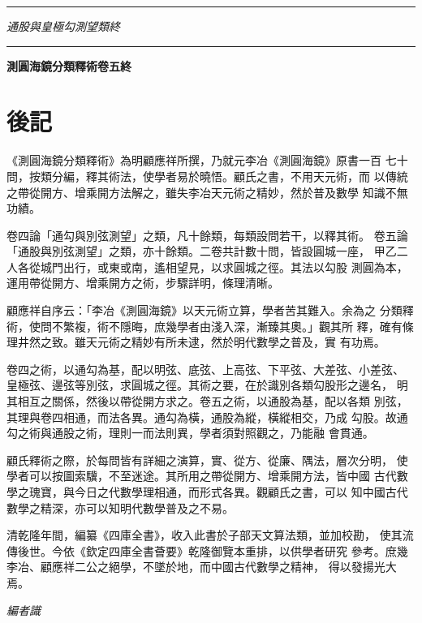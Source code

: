 \documentclass[11pt,a4paper]{article}
\newcommand{\longline}{\noindent\rule{\textwidth}{0.4pt}}
\begin{document}
\vspace{0.5cm}
\longline
\begin{center}
\textit{通股與皇極勾測望類終}
\end{center}

\vspace{0.5cm}
\longline
\begin{center}
{\Large\bfseries\color{volcolor} 測圓海鏡分類釋術卷五終}
\end{center}

\newpage

\section*{後記}

《測圓海鏡分類釋術》為明顧應祥所撰，乃就元李冶《測圓海鏡》原書一百
七十問，按類分編，釋其術法，使學者易於曉悟。顧氏之書，不用天元術，而
以傳統之帶從開方、增乘開方法解之，雖失李冶天元術之精妙，然於普及數學
知識不無功績。

卷四論「通勾與別弦測望」之類，凡十餘類，每類設問若干，以釋其術。
卷五論「通股與別弦測望」之類，亦十餘類。二卷共計數十問，皆設圓城一座，
甲乙二人各從城門出行，或東或南，遙相望見，以求圓城之徑。其法以勾股
測圓為本，運用帶從開方、增乘開方之術，步驟詳明，條理清晰。

顧應祥自序云：「李冶《測圓海鏡》以天元術立算，學者苦其難入。余為之
分類釋術，使問不繁複，術不隱晦，庶幾學者由淺入深，漸臻其奧。」觀其所
釋，確有條理井然之致。雖天元術之精妙有所未逮，然於明代數學之普及，實
有功焉。

卷四之術，以通勾為基，配以明弦、底弦、上高弦、下平弦、大差弦、小差弦、
皇極弦、邊弦等別弦，求圓城之徑。其術之要，在於識別各類勾股形之邊名，
明其相互之關係，然後以帶從開方求之。卷五之術，以通股為基，配以各類
別弦，其理與卷四相通，而法各異。通勾為橫，通股為縱，橫縱相交，乃成
勾股。故通勾之術與通股之術，理則一而法則異，學者須對照觀之，乃能融
會貫通。

顧氏釋術之際，於每問皆有詳細之演算，實、從方、從廉、隅法，層次分明，
使學者可以按圖索驥，不至迷途。其所用之帶從開方、增乘開方法，皆中國
古代數學之瑰寶，與今日之代數學理相通，而形式各異。觀顧氏之書，可以
知中國古代數學之精深，亦可以知明代數學普及之不易。

清乾隆年間，編纂《四庫全書》，收入此書於子部天文算法類，並加校勘，
使其流傳後世。今依《欽定四庫全書薈要》乾隆御覽本重排，以供學者研究
參考。庶幾李冶、顧應祥二公之絕學，不墜於地，而中國古代數學之精神，
得以發揚光大焉。

\vspace{1cm}
\begin{flushright}
\textit{編者識}
\end{flushright}
\end{document}
